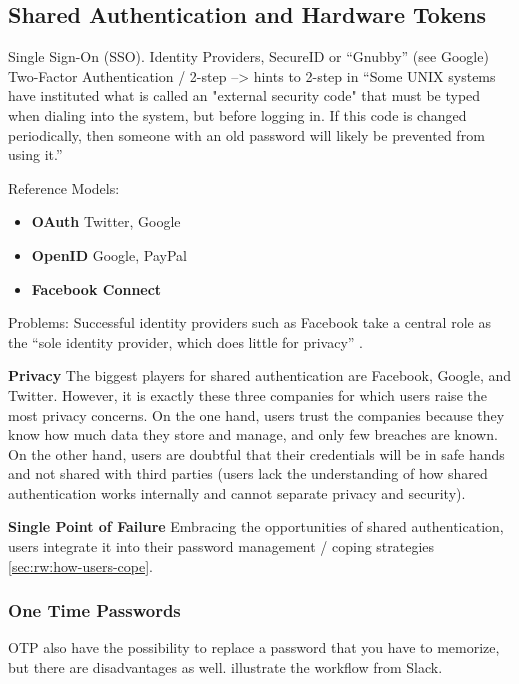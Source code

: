 	
	\subsection{Shared Authentication and Hardware Tokens}\label{sec:rw:shared_auth_tokens}
Single Sign-On (SSO). 
Identity Providers, 
SecureID or ``Gnubby'' (see Google)
Two-Factor Authentication / 2-step --> hints to 2-step in ``Some UNIX systems have instituted what is called an "external security code" that must be typed when dialing into the system, but before logging in. If this code is changed periodically, then someone with an old password will likely be prevented from using it.'' \cite{Morris1979PasswordSecurity}

Reference Models:

\cite{Egelman2013ProfilePassword,Sun2010BillionKeys}

\begin{itemize}
\item \textbf{OAuth} Twitter, Google
\item \textbf{OpenID} Google, PayPal
\item \textbf{Facebook Connect} 
\end{itemize}
Problems: 
Successful identity providers such as Facebook take a central role as the ``sole identity provider, which does little for privacy'' \cite{Bonneau2015ImperfectAuthentication}.


\textbf{Privacy} The biggest players for shared authentication are Facebook, Google, and Twitter. However, it is exactly these three companies for which users raise the most privacy concerns. On the one hand, users trust the companies because they know how much data they store and manage, and only few breaches are known. On the other hand, users are doubtful that their credentials will be in safe hands and not shared with third parties (users lack the understanding of how shared authentication works internally and cannot separate privacy and security). 

\textbf{Single Point of Failure} Embracing the opportunities of shared authentication, users integrate it into their password management / coping strategies \ref{sec:rw:how-users-cope}. 

	
\subsubsection{One Time Passwords}

OTP also have the possibility to replace a password that you have to memorize, but there are disadvantages as well. 
illustrate the workflow from Slack.


